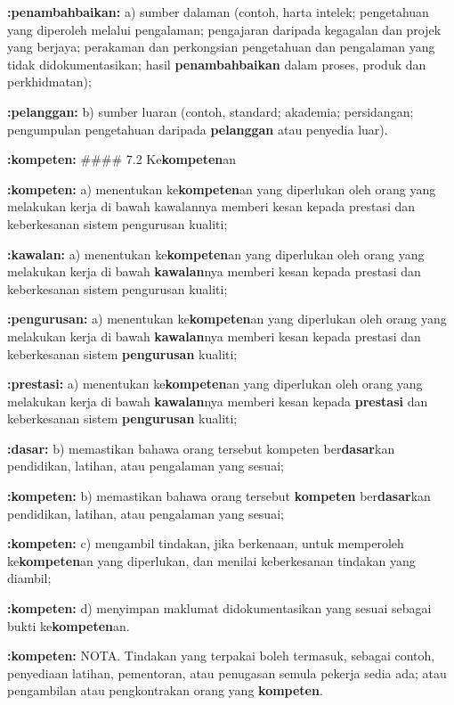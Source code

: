 \documentclass{article}
\begin{document}
\textbf{:penambahbaikan:} a) sumber dalaman (contoh, harta intelek; pengetahuan yang diperoleh melalui pengalaman;
pengajaran daripada kegagalan dan projek yang berjaya; perakaman dan perkongsian
pengetahuan dan pengalaman yang tidak didokumentasikan; hasil \textbf{penambahbaikan} dalam proses,
produk dan perkhidmatan);

\textbf{:pelanggan:} b) sumber luaran (contoh, standard; akademia; persidangan; pengumpulan pengetahuan daripada
\textbf{pelanggan} atau penyedia luar).

\textbf{:kompeten:} \#\#\#\# 7.2 Ke\textbf{kompeten}an

\textbf{:kompeten:} a) menentukan ke\textbf{kompeten}an yang diperlukan oleh orang yang melakukan kerja di bawah
kawalannya memberi kesan kepada prestasi dan keberkesanan sistem pengurusan
kualiti;

\textbf{:kawalan:} a) menentukan ke\textbf{kompeten}an yang diperlukan oleh orang yang melakukan kerja di bawah
\textbf{kawalan}nya memberi kesan kepada prestasi dan keberkesanan sistem pengurusan
kualiti;

\textbf{:pengurusan:} a) menentukan ke\textbf{kompeten}an yang diperlukan oleh orang yang melakukan kerja di bawah
\textbf{kawalan}nya memberi kesan kepada prestasi dan keberkesanan sistem \textbf{pengurusan}
kualiti;

\textbf{:prestasi:} a) menentukan ke\textbf{kompeten}an yang diperlukan oleh orang yang melakukan kerja di bawah
\textbf{kawalan}nya memberi kesan kepada \textbf{prestasi} dan keberkesanan sistem \textbf{pengurusan}
kualiti;

\textbf{:dasar:} b) memastikan bahawa orang tersebut kompeten ber\textbf{dasar}kan pendidikan, latihan, atau
pengalaman yang sesuai;

\textbf{:kompeten:} b) memastikan bahawa orang tersebut \textbf{kompeten} ber\textbf{dasar}kan pendidikan, latihan, atau
pengalaman yang sesuai;

\textbf{:kompeten:} c) mengambil tindakan, jika berkenaan, untuk memperoleh ke\textbf{kompeten}an yang diperlukan,
dan menilai keberkesanan tindakan yang diambil;

\textbf{:kompeten:} d) menyimpan maklumat didokumentasikan yang sesuai sebagai bukti ke\textbf{kompeten}an.

\textbf{:kompeten:} NOTA. Tindakan yang terpakai boleh termasuk, sebagai contoh, penyediaan latihan, pementoran, atau
penugasan semula pekerja sedia ada; atau pengambilan atau pengkontrakan orang yang \textbf{kompeten}.
\end{document}
